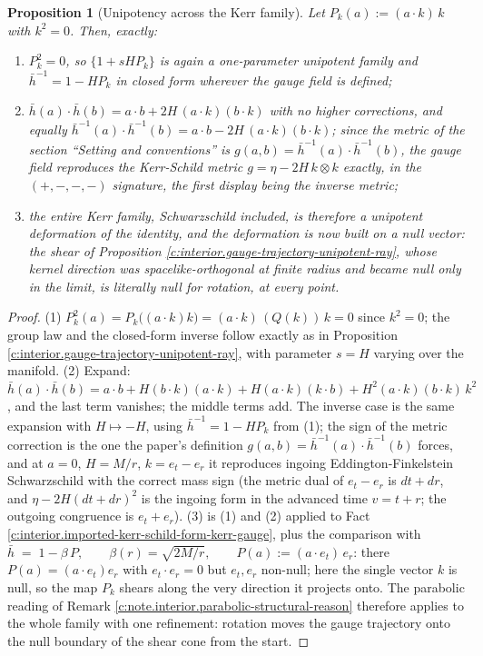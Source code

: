 \documentclass[11pt]{article}
\newtheorem{proposition}[theorem]{Proposition}
\theoremstyle{definition}
\theoremstyle{plain}
\newcommand{\changedmark}[2]{\marginpar{\raggedright\scriptsize\color{#1}#2}}
\providecommand{\er}{}\renewcommand{\er}{e_r}
\providecommand{\et}{}\renewcommand{\et}{e_t}
\providecommand{\hb}{}\renewcommand{\hb}{\bar{h}}
\begin{document}
\begin{proposition}[Unipotency across the Kerr family]\label{c:interior.unipotency-across-kerr-family}
\changedmark{gray}{reworded}
Let $P_k(a) := (a\cdot k)\,k$ with $k^2 = 0$. Then, exactly:
\begin{enumerate}
\item $P_k^2 = 0$, so $\{1 + sHP_k\}$ is again a one-parameter unipotent family and $\hb^{-1} = 1 - H P_k$ in closed form wherever the gauge field is defined;
\item $\hb(a)\cdot\hb(b) = a\cdot b + 2H\,(a\cdot k)(b\cdot k)$ with no higher corrections, and equally $\hb^{-1}(a)\cdot\hb^{-1}(b) = a\cdot b - 2H\,(a\cdot k)(b\cdot k)$; since the metric of the section ``Setting and conventions'' is $g(a,b) = \hb^{-1}(a)\cdot\hb^{-1}(b)$, the gauge field reproduces the Kerr-Schild metric $g = \eta - 2H\,k\otimes k$ exactly, in the $(+,-,-,-)$ signature, the first display being the inverse metric;
\item the entire Kerr family, Schwarzschild included, is therefore a unipotent deformation of the identity, and the deformation is now built on a \emph{null} vector: the shear of Proposition \ref{c:interior.gauge-trajectory-unipotent-ray}, whose kernel direction was spacelike-orthogonal at finite radius and became null only in the limit, is literally null for rotation, at every point.
\end{enumerate}
\end{proposition}
\begin{proof}
(1) $P_k^2(a) = P_k\bigl((a\cdot k)k\bigr) = (a\cdot k)\,(Q(k))\,k = 0$ since $k^2 = 0$; the group law and the closed-form inverse follow exactly as in Proposition \ref{c:interior.gauge-trajectory-unipotent-ray}, with parameter $s = H$ varying over the manifold. (2) Expand: $\hb(a)\cdot\hb(b) = a\cdot b + H(b\cdot k)(a\cdot k) + H(a\cdot k)(k\cdot b) + H^2 (a\cdot k)(b\cdot k)\,k^2$, and the last term vanishes; the middle terms add. The inverse case is the same expansion with $H \mapsto -H$, using $\hb^{-1} = 1 - HP_k$ from (1); the sign of the metric correction is the one the paper's definition $g(a,b) = \hb^{-1}(a)\cdot\hb^{-1}(b)$ forces, and at $a = 0$, $H = M/r$, $k = \et - \er$ it reproduces ingoing Eddington-Finkelstein Schwarzschild with the correct mass sign (the metric dual of $\et - \er$ is $dt + dr$, and $\eta - 2H(dt + dr)^2$ is the ingoing form in the advanced time $v = t + r$; the outgoing congruence is $\et + \er$). (3) is (1) and (2) applied to Fact \ref{c:interior.imported-kerr-schild-form-kerr-gauge}, plus the comparison with $\hb \;=\; 1 - \beta\,P, \qquad \beta(r) = \sqrt{2M/r}, \qquad P(a) := (a \cdot \et)\,\er$: there $P(a) = (a\cdot\et)\er$ with $\et\cdot\er = 0$ but $\et, \er$ non-null; here the single vector $k$ is null, so the map $P_k$ shears along the very direction it projects onto. The parabolic reading of Remark \ref{c:note.interior.parabolic-structural-reason} therefore applies to the whole family with one refinement: rotation moves the gauge trajectory onto the null boundary of the shear cone from the start.

\end{proof}
\end{document}
